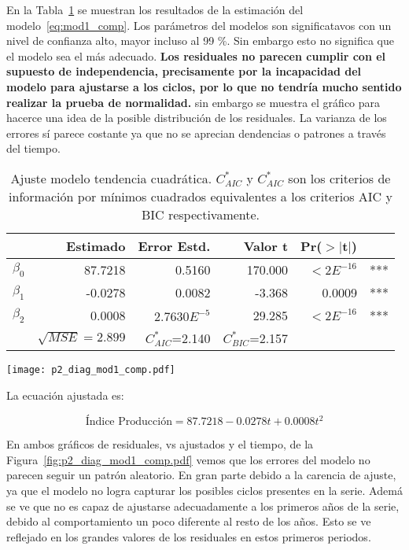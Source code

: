 \documentclass{tufte-handout}
\begin{document}
En la Tabla~\ref{tab:mod1_comp} se muestran los resultados de la estimación del modelo~\ref{eq:mod1_comp}. Los parámetros del modelos son significatavos con un nivel de confianza alto, mayor incluso al 99 \%. Sin embargo esto no significa que el modelo sea el más adecuado. \textbf{Los residuales no parecen cumplir con el supuesto de independencia, precisamente por la incapacidad del modelo para ajustarse a los ciclos, por lo que no tendría mucho sentido realizar la prueba de normalidad.} sin embargo se muestra el gráfico para hacerce una idea de la posible distribución de los residuales. La varianza de los errores sí parece costante ya que no se aprecian dendencias o patrones a través del tiempo.

\begin{table}[ht]
\centering
\begin{tabular}{lrrrrl}
            & Estimado & Error Estd. & Valor t & Pr($>$$|$t$|$) & \\ 
  \hline
  $\beta_0$ & 87.7218 & 0.5160 & 170.000 & $< 2E^{-16}$ & *** \\ 
  $\beta_1$ & -0.0278 & 0.0082 & -3.368 & 0.0009 & *** \\ 
  $\beta_2$ & 0.0008 & $2.7630E^{-5}$ & 29.285 & $< 2E^{-16}$ & *** \\ 
   \hline
            & $\sqrt{MSE}=2.899$ & $C^{*}_{AIC}$=2.140 & $C^{*}_{BIC}$=2.157 & \\
   \hline
\end{tabular}
\caption{Ajuste modelo tendencia cuadrática. $C^{*}_{AIC}$ y $C^{*}_{AIC}$ son los criterios de información por mínimos cuadrados equivalentes a los criterios AIC y BIC respectivamente.} 
\label{tab:mod1_comp}
\end{table}

\begin{figure*}[!ht]
    \texttt{[image: p2\_diag\_mod1\_comp.pdf]}
    \caption{Gráficos de diagnóstico modelo tendencia cuadrática}
    \label{fig:p2_diag_mod1_comp.pdf}
\end{figure*}

La ecuación ajustada es:

\begin{equation}
	\text{Índice Producción} = 87.7218 -0.0278 t + 0.0008 t^2
\end{equation}

En ambos gráficos de residuales, vs ajustados y el tiempo, de la Figura~\ref{fig:p2_diag_mod1_comp.pdf} vemos que los errores del modelo no parecen seguir un patrón aleatorio. En gran parte debido a la carencia de ajuste, ya que el modelo no logra capturar los posibles ciclos presentes en la serie. Ademá se ve que no es capaz de ajustarse adecuadamente a los primeros años de la serie, debido al comportamiento un poco diferente al resto de los años. Esto se ve reflejado en los grandes valores de los residuales en estos primeros periodos.
\end{document}
